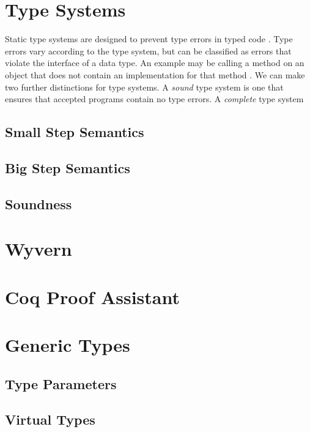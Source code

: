 \documentclass[11pt
              , a4paper
              , twoside
              , openright
              ]{report}
\numberwithin{case}{theorem}
\numberwithin{subcase}{case}
\begin{document}
\section{Type Systems}
Static type systems are designed to prevent type errors in typed code \cite{Felleisen 1994}. Type errors vary according to the type system, but can be classified as errors that violate the interface of a data type. An example may be calling a method on an object that does not contain an implementation for that method \cite{Felleisen 1994}. We can make two further distinctions for type systems. A \emph{sound} type system is one that ensures that accepted programs contain no type errors. A \emph{complete} type system 

\subsection{Small Step Semantics}

\subsection{Big Step Semantics}

\subsection{Soundness}


\section{Wyvern}

\section{Coq Proof Assistant}






\section{Generic Types}


\subsection{Type Parameters}

\subsection{Virtual Types}
\end{document}
